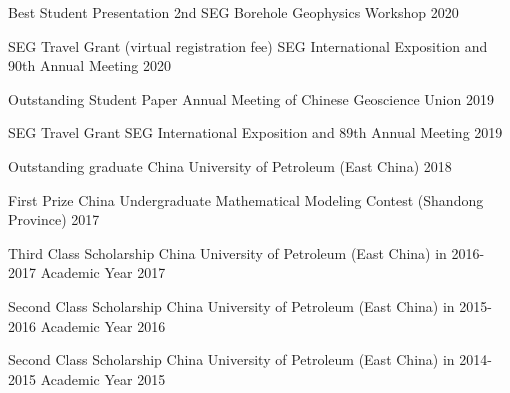 
\begin{cvhonors}

  \cvhonor
    {Best Student Presentation} %
    {2nd SEG Borehole Geophysics Workshop} %
    {} %
    {2020} %

  \cvhonor
    {SEG Travel Grant (virtual registration fee)} %
    {SEG International Exposition and 90th Annual Meeting} %
    {} %
    {2020} %

  \cvhonor
    {Outstanding Student Paper} %
    {Annual Meeting of Chinese Geoscience Union} %
    {} %
    {2019} %

  \cvhonor
    {SEG Travel Grant} %
    {SEG International Exposition and 89th Annual Meeting} %
    {} %
    {2019} %

  \cvhonor
    {Outstanding graduate} %
    {China University of Petroleum (East China)} %
    {} %
    {2018} %

  \cvhonor
    {First Prize} %
    {China Undergraduate Mathematical Modeling Contest (Shandong Province)} %
    {} %
    {2017} %

  \cvhonor
    {Third Class Scholarship} %
    {China University of Petroleum (East China) in 2016-2017 Academic Year} %
    {} %
    {2017} %

  \cvhonor
    {Second Class Scholarship} %
    {China University of Petroleum (East China) in 2015-2016 Academic Year} %
    {} %
    {2016} %

  \cvhonor
    {Second Class Scholarship} %
    {China University of Petroleum (East China) in 2014-2015 Academic Year} %
    {} %
    {2015} %

\end{cvhonors}
